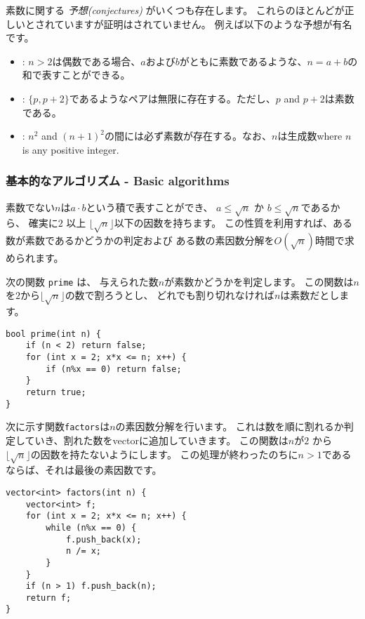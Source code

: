 素数に関する \emph{予想(conjectures)} がいくつも存在します。
これらのほとんどが正しいとされていますが証明はされていません。
例えば以下のような予想が有名です。

\begin{itemize}
\item {}:
$n > 2$は偶数である場合、$a$および$b$がともに素数であるような、$n = a + b$の和で表すことができる。
\item {}:
$\{p,p+2\}$であるようなペアは無限に存在する。ただし、$p$ and $p+2$は素数である。
\item {}:
$n^2$ and $(n+1)^2$の間には必ず素数が存在する。なお、$n$は生成数where $n$ is any positive integer.
\end{itemize}

\subsubsection{基本的なアルゴリズム - Basic algorithms}

素数でない$n$は$a \cdot b$という積で表すことができ、 $a \le \sqrt n$ か $b \le \sqrt n$であるから、
確実に$2$ 以上 $\lfloor \sqrt n \rfloor$以下の因数を持ちます。
この性質を利用すれば、ある数が素数であるかどうかの判定および
ある数の素因数分解を$O(\sqrt n)$時間で求められます。

次の関数 \texttt{prime} は、
与えられた数$n$が素数かどうかを判定します。
この関数は$n$を$2$から$\lfloor \sqrt n \rfloor$の数で割ろうとし、
どれでも割り切れなければ$n$は素数だとします。

\begin{lstlisting}
bool prime(int n) {
    if (n < 2) return false;
    for (int x = 2; x*x <= n; x++) {
        if (n%x == 0) return false;
    }
    return true;
}
\end{lstlisting}

\noindent
次に示す関数\texttt{factors}は$n$の素因数分解を行います。
これは数を順に割れるか判定していき、割れた数をvectorに追加していきます。
この関数は$n$が$2$ から $\lfloor \sqrt n \rfloor$の因数を持たないようにします。
この処理が終わったのちに$n>1$であるならば、それは最後の素因数です。
\begin{lstlisting}
vector<int> factors(int n) {
    vector<int> f;
    for (int x = 2; x*x <= n; x++) {
        while (n%x == 0) {
            f.push_back(x);
            n /= x;
        }
    }
    if (n > 1) f.push_back(n);
    return f;
}
\end{lstlisting}

